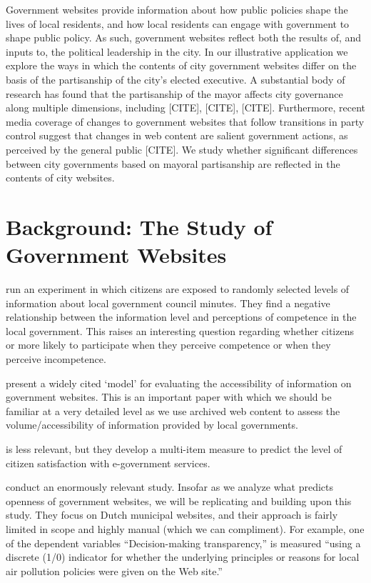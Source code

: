 \documentclass[11pt]{article}
\begin{document}
Government websites provide information about how public policies shape the lives of local residents, and how local residents can engage with government to shape public policy. As such, government websites reflect both the results of, and inputs to, the political leadership in the city. In our illustrative application we explore the ways in which the contents of city government websites differ on the basis of the partisanship of the city's elected executive. A substantial body of research has found that the partisanship of the mayor affects city governance along multiple dimensions, including [CITE], [CITE], [CITE]. Furthermore, recent media coverage of changes to government websites that follow transitions in party control suggest that changes in web content are salient government actions, as perceived by the general public [CITE]. We study whether significant differences between city governments based on mayoral partisanship are reflected in the contents of city websites.


\section{Background: The Study of Government Websites}

\cite{grimmelikhuijsen2010transparency} run an experiment in which citizens are exposed to randomly selected levels of information about local government council minutes. They find a negative relationship between the information level and perceptions of competence in the local government. This raises an interesting question regarding whether citizens or more likely to participate when they perceive competence or when they perceive incompetence.

\cite{wang2005evaluating} present a widely cited `model' for evaluating the accessibility of information on government websites. This is an important paper with which we should be familiar at a very detailed level as we use archived web content to assess the volume/accessibility of information provided by local governments.

\cite{osman2014cobra} is less relevant, but they develop a multi-item measure to predict the level of citizen satisfaction with e-government services. 


\cite{grimmelikhuijsen2012developing} conduct an enormously relevant study. Insofar as we analyze what predicts openness of government websites, we will be replicating and building upon this study. They focus on Dutch municipal websites, and their approach is fairly limited in scope and highly manual (which we can compliment). For example, one of the dependent variables ``Decision-making transparency,'' is measured ``using a discrete (1/0) indicator for whether the underlying principles or reasons for local air pollution policies were given on the Web site.'' 
\end{document}
